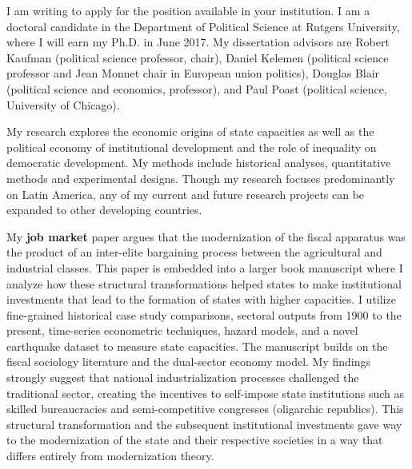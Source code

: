 \documentclass[10pt,stdletter,dateno,sigleft]{newlfm} %
\begin{document}
\begin{newlfm}


I am writing to apply for the position available in your institution. I am a doctoral candidate in the Department of Political Science at Rutgers University, where I will earn my Ph.D. in June 2017. My dissertation advisors are Robert Kaufman (political science professor, chair), Daniel Kelemen (political science professor and Jean Monnet chair in European union politics), Douglas Blair (political science and economics, professor), and Paul Poast (political science, University of Chicago).

My research explores the economic origins of state capacities as well as the political economy of institutional development and the role of inequality on democratic development. My methods include historical analyses, quantitative methods and experimental designs. Though my research focuses predominantly on Latin America, any of my current and future research projects can be expanded to other developing countries.


My {\bf job market} paper argues that the modernization of the fiscal apparatus was the product of an inter-elite bargaining process between the agricultural and industrial classes. This paper is embedded into a larger book manuscript where I analyze how these structural transformations helped states to make institutional investments that lead to the formation of states with higher capacities. I utilize fine-grained historical case study comparisons, sectoral outputs from 1900 to the present, time-series econometric techniques, hazard models, and a novel earthquake dataset to measure state capacities. The manuscript builds on the fiscal sociology literature and the dual-sector economy model. My findings strongly suggest that national industrialization processes challenged the traditional sector, creating the incentives to self-impose state institutions such as skilled bureaucracies and semi-competitive congresses (oligarchic republics). This structural transformation and the subsequent institutional investments gave way to the modernization of the state and their respective societies in a way that differs entirely from modernization theory.



\end{newlfm}
\end{document}
